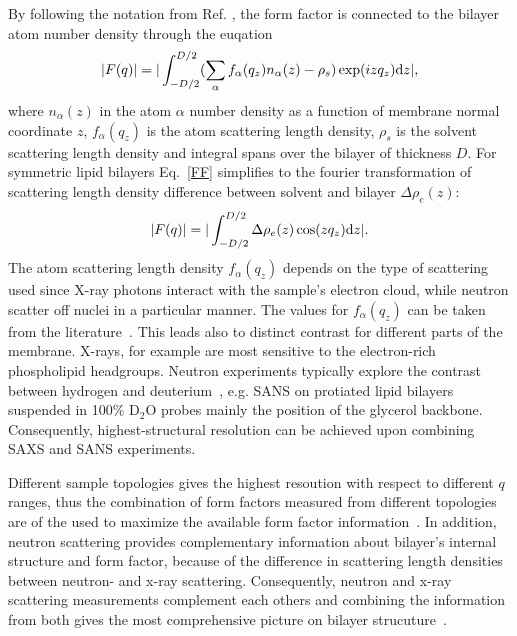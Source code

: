 \documentclass[aps,prl,superscriptaddress,twocolumn]{revtex4}
\begin{document}
By following the notation from Ref. \cite{kucerka10}, the form factor is connected to the bilayer atom number density through the 
euqation 
\begin{equation}\label{FF}
|F(q)|=|\int_{-D/2}^{D/2}(\sum_\alpha f_\alpha(q_z)n_\alpha(z) - \rho_s) \exp(i z q_z) {\rm d}z|,
\end{equation}
where $n_\alpha(z)$ in the atom $\alpha$ number density as a function of membrane normal coordinate $z$,
$f_\alpha(q_z)$ is the atom scattering length density,
$\rho_s$ is the solvent scattering length density and integral spans over the bilayer of thickness $D$.
For symmetric lipid bilayers Eq.~\ref{FF} simplifies to the fourier transformation of scattering length density
difference between solvent and bilayer $\Delta \rho_e(z)$:
\begin{equation}\label{FFsimpl}
|F(q)|=|\int_{-D/2}^{D/2}\Delta \rho_e(z) \cos(zq_z) {\rm d}z|.
\end{equation}
The atom scattering length density $f_\alpha(q_z)$ depends on the type of scattering used since
X-ray photons interact with the sample's electron cloud, while neutron scatter off nuclei in a particular manner.
The values for $f_\alpha(q_z)$ can be taken from the literature~\cite{??}.
This leads also to distinct contrast for different parts of the membrane. X-rays, for example are most sensitive to the electron-rich 
phospholipid headgroups. Neutron experiments typically explore the contrast between hydrogen and deuterium~\cite{Marquardt2015}, 
e.g. SANS on protiated lipid bilayers suspended in 100\% D$_2$O probes mainly the position of the glycerol 
backbone. Consequently, highest-structural resolution can be achieved upon combining SAXS and SANS experiments.

Different sample topologies gives the highest resoution with respect to different $q$ ranges,
thus the combination of form factors measured from different topologies are of the used
to maximize the available form factor information~\cite{kucerka05}. In addition, neutron scattering provides complementary information 
about bilayer's internal structure and form factor, because of the difference in scattering length densities between neutron- and x-ray 
scattering. Consequently, neutron and x-ray scattering measurements complement each others and combining the information
from both gives the most comprehensive picture on bilayer strucuture~\cite{kucerka08a}. \\


\onecolumngrid
{}
\end{document}
